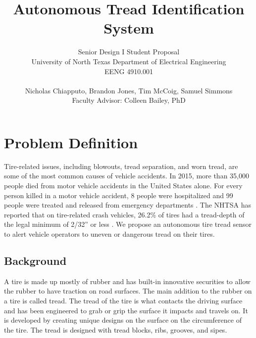 \documentclass[11pt]{IEEEtran}
\begin{document}
	\title{ \vspace{-0.0575in} Autonomous Tread Identification System }

	\author{	Senior Design I Student Proposal \\
				University of North Texas Department of Electrical Engineering \\
				EENG 4910.001 \\ \\
				Nicholas Chiapputo, Brandon Jones, Tim McCoig, Samuel Simmons \\
				Faculty Advisor: Colleen Bailey, PhD
	}

	\maketitle


	\section{Problem Definition}
		Tire-related issues, including blowouts, tread separation, and worn tread, are some of the most common causes of vehicle accidents. In 2015, more than 35,000 people died from motor vehicle accidents in the United States alone. For every person killed in a motor vehicle accident, 8 people were hospitalized and 99 people were treated and released from emergency departments \cite{cdcKeyStats}. The NHTSA has reported that on tire-related crash vehicles, 26.2\% of tires had a tread-depth of the legal minimum of 2/32'' or less \cite[pp.~8-9]{nhtsaCrashStats}. We propose an autonomous tire tread sensor to alert vehicle operators to uneven or dangerous tread on their tires.

		\subsection{Background}
			A tire is made up mostly of rubber and has built-in innovative securities to allow the rubber to have traction on road surfaces. The main addition to the rubber on a tire is called tread. The tread of the tire is what contacts the driving surface and has been engineered to grab or grip the surface it impacts and travels on. It is developed by creating unique designs on the surface on the circumference of the tire. The tread is designed with tread blocks, ribs, grooves, and sipes.
\end{document}
